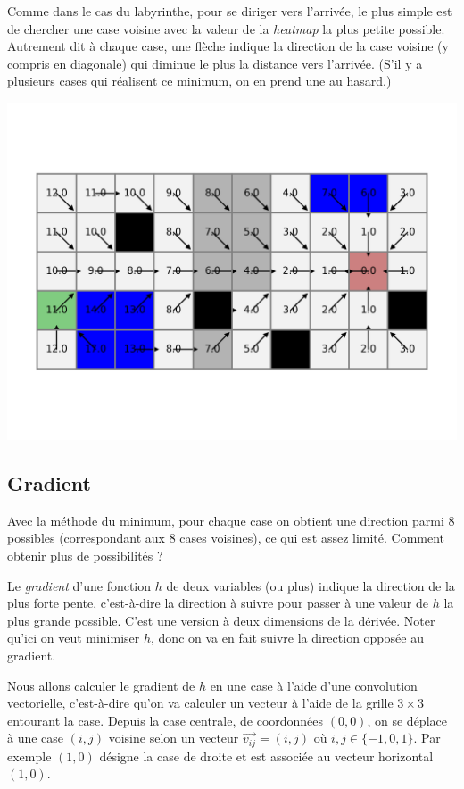 \documentclass[11pt,class=report,crop=false]{standalone}
\begin{document}
Comme dans le cas du labyrinthe, pour se diriger vers l'arrivée,
le plus simple est de chercher une case voisine avec la valeur de la \emph{heatmap} la plus petite possible.
Autrement dit à chaque case, une flèche indique la direction de la case voisine (y compris en diagonale) qui diminue le plus la distance vers l'arrivée. (S'il y a plusieurs cases qui réalisent ce minimum, on en prend une au hasard.)

\begin{center}
	\includegraphics[scale=\myscale,scale=0.5,trim={0 2cm 0 2cm},clip]{figures/terrain-01-7}
\end{center}



\subsection{Gradient}

Avec la méthode du minimum, pour chaque case on obtient une direction parmi $8$ possibles (correspondant aux $8$ cases voisines), ce qui est assez limité. Comment obtenir plus de possibilités ?

Le \emph{gradient} d'une fonction $h$ de deux variables (ou plus) indique la direction de la plus forte pente, c'est-à-dire la direction à suivre pour passer à une valeur de $h$ la plus grande possible. C'est une version à deux dimensions de la dérivée.
Noter qu'ici on veut minimiser $h$, donc on va en fait suivre la direction opposée au gradient.

Nous allons calculer le gradient de $h$ en une case à l'aide d'une convolution vectorielle, c'est-à-dire qu'on va calculer un vecteur à l'aide de la grille $3\times3$ entourant la case.
Depuis la case centrale, de coordonnées $(0,0)$, on se déplace à une case $(i,j)$ voisine selon un vecteur $\vec{v_{ij}} = (i,j)$ où $i,j \in \{-1,0,1\}$. Par exemple $(1,0)$ désigne la case de droite et est associée au vecteur horizontal $(1,0)$.
\end{document}
